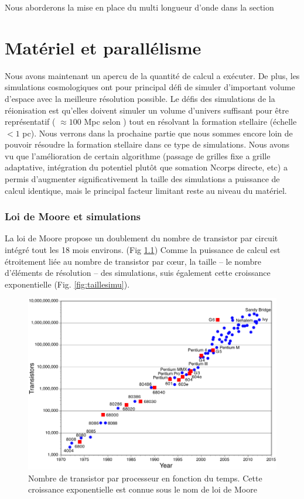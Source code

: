 Nous aborderons la mise en place du multi longueur d'onde dans la section %



\chapter{Matériel et parallélisme}

Nous avons maintenant un apercu de la quantité de calcul a exécuter.
De plus, les simulations cosmologiques ont pour principal défi de simuler d'important volume d'espace avec la meilleure résolution possible.
Le défis des simulations de la réionisation est qu'elles doivent simuler un volume d'univers suffisant pour être représentatif ( $\approx 100$ Mpc selon \cite{iliev_cosmological_2006}) tout en résolvant la formation stellaire (échelle $<1$ pc).
Nous verrons dans la prochaine partie que nous sommes encore loin de pouvoir résoudre la formation stellaire dans ce type de simulations. %
Nous avons vu que l'amélioration de certain algorithme (passage de grilles fixe a grille adaptative, intégration du potentiel plutôt que somation Ncorps directe, etc) a permis d'augmenter significativement la taille des simulations a puissance de calcul identique, mais le principal facteur limitant reste au niveau du matériel.

\subsection{Loi de Moore et simulations}
La loi de Moore \citep{moore1965cramming} propose un doublement du nombre de transistor par circuit intégré tout les 18 mois environs. (Fig \ref{fig:moore})
Comme la puissance de calcul est étroitement liée au nombre de transistor par cœur, la taille -- le nombre d'éléments de résolution -- des simulations, suis également cette croissance exponentielle (Fig. \ref{fig:taillesimu}).

\begin{figure}[bth]
        \includegraphics[width=.95\linewidth]{img/02/moorelaw.png} 
        \caption{Nombre de transistor par processeur en fonction du temps.
        Cette croissance exponentielle est connue sous le nom de loi de Moore}
 		\label{fig:moore}
\end{figure}

